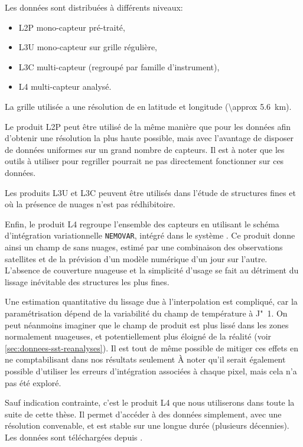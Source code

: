 \documentclass[index]{subfiles}
\begin{document}
Les données sont distribuées à différents niveaux:
\begin{itemize}
  \item L2P mono-capteur pré-traité,
  \item L3U mono-capteur sur grille régulière,
  \item L3C multi-capteur (regroupé par famille d'instrument),
  \item L4 multi-capteur analysé.
\end{itemize}
La grille utilisée a une résolution de  en latitude et longitude (\qty{\approx 5.6}{\km}).

Le produit L2P peut être utilisé de la même manière que pour les données  afin d'obtenir une résolution la plus haute possible, mais avec l'avantage de disposer de données uniformes sur un grand nombre de capteurs.
Il est à noter que les outils à utiliser pour regriller pourrait ne pas directement fonctionner sur ces données.

Les produits L3U et L3C peuvent être utilisés dans l'étude de structures fines et où la présence de nuages n'est pas rédhibitoire.

Enfin, le produit L4 regroupe l'ensemble des capteurs en utilisant le schéma d'intégration variationnelle \verb|NEMOVAR|, intégré dans le système  \parencite{good_2020}.
Ce produit donne ainsi un champ de  sans nuages, estimé par une combinaison des observations satellites et de la prévision d'un modèle numérique d'un jour sur l'autre.
L'absence de couverture nuageuse et la simplicité d'usage se fait au détriment du lissage inévitable des structures les plus fines.

Une estimation quantitative du lissage due à l'interpolation est compliqué, car la paramétrisation dépend de la variabilité du champ de température à J"~1.
On peut néanmoins imaginer que le champ de  produit est plus lissé dans les zones normalement nuageuses, et potentiellement plus éloigné de la réalité (voir \cref{sec:donnees-sst-reanalyses}).
Il est tout de même possible de mitiger ces effets en ne comptabilisant dans nos résultats seulement
À noter qu'il serait également possible d'utiliser les erreurs d'intégration associées à chaque pixel, mais cela n'a pas été exploré.

Sauf indication contrainte, c'est le produit L4 que nous utiliserons dans toute la suite de cette thèse.
Il permet d'accéder à des données  simplement, avec une résolution convenable, et est stable sur une longue durée (plusieurs décennies).
Les données sont téléchargées depuis .
\end{document}
